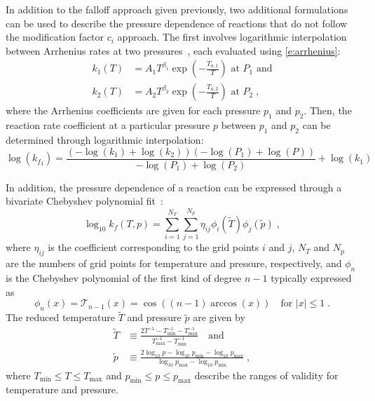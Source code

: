 \documentclass[12pt]{article}
\begin{document}
In addition to the falloff approach given previously, two additional formulations can be used to describe the pressure dependence of reactions that do not follow the modification factor $c_i$ approach.
The first involves logarithmic interpolation between Arrhenius rates at two pressures~\cite{chemkin:2012,Goodwin:2015aa}, each evaluated using \cref{e:arrhenius}:
\begin{align}
k_1 (T) &= A_1 T^{\beta_1} \exp \left( -\frac{T_{a, 1}}{T} \right) \text{ at } P_1 \text{ and} \label{e:plog_k1} \\
k_2 (T) &= A_2 T^{\beta_2} \exp \left( -\frac{T_{a, 2}}{T} \right) \text{ at } P_2 \;, \label{e:plog_k2}
\end{align}
where the Arrhenius coefficients are given for each pressure $p_1$ and $p_2$.
Then, the reaction rate coefficient at a particular pressure $p$ between $p_1$ and $p_2$ can be determined through logarithmic interpolation:
\begin{equation}
\log{\left ({k_f}_{i} \right )} = \frac{\left(- \log{\left (k_{1} \right )} + \log{\left (k_{2} \right )}\right) \left(- \log{\left (P_{1} \right )} + \log{\left (P \right )}\right)}{- \log{\left (P_{1} \right )} + \log{\left (P_{2} \right )}} + \log{\left (k_{1} \right )}
\end{equation}

In addition, the pressure dependence of a reaction can be expressed through a bivariate Chebyshev polynomial fit~\cite{Venkatesh:1997hv,Venkatesh:1997ik,Venkatesh:2000gj,chemkin:2012,Goodwin:2015aa}:
\begin{equation}
\log_{10} k_f (T, p) = \sum_{i = 1}^{N_T} \sum_{j = 1}^{N_p} \eta_{ij} \phi_i (\tilde{T}) \phi_j \left(\tilde{p}\right) \label{e:cheb} \;,
\end{equation}
where $\eta_{ij}$ is the coefficient corresponding to the grid points $i$ and $j$, $N_T$ and $N_p$ are the numbers of grid points for temperature and pressure, respectively, and $\phi_n$ is the Chebyshev polynomial of the first kind of degree $n - 1$ typically expressed as
\begin{equation}
\phi_n (x) = \mathcal{T}_{n-1} (x) = \cos \left( (n - 1) \arccos (x) \right) \quad \text{for } |x| \leq 1 \;.
\end{equation}
The reduced temperature $\tilde{T}$ and pressure $\tilde{p}$ are given by
\begin{align}
\tilde{T} &\equiv \frac{2 T^{-1} - T^{-1}_{\min} - T^{-1}_{\max}}{T^{-1}_{\max} - T^{-1}_{\min}} \quad\text{and} \\
\tilde{p} &\equiv \frac{2\log_{10} p - \log_{10} p_{\min} - \log_{10} p_{\max}}{\log_{10} p_{\max} - \log_{10} p_{\min}} \;,
\end{align}
where $T_{\min} \leq T \leq T_{\max}$ and $p_{\min} \leq p \leq p_{\max}$ describe the ranges of validity for temperature and pressure.
\end{document}
